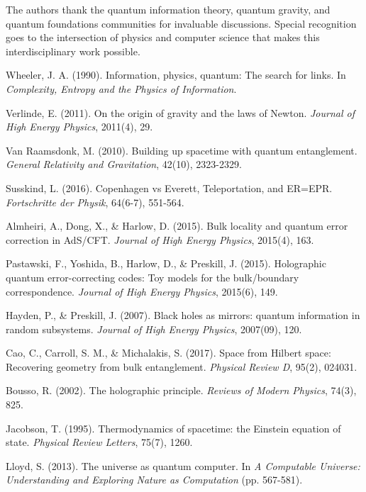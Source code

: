 \documentclass[12pt,a4paper]{article}
\begin{document}
The authors thank the quantum information theory, quantum gravity, and quantum foundations communities for invaluable discussions. Special recognition goes to the intersection of physics and computer science that makes this interdisciplinary work possible.

\begin{thebibliography}{99}

 Wheeler, J. A. (1990). Information, physics, quantum: The search for links. In \textit{Complexity, Entropy and the Physics of Information}.

 Verlinde, E. (2011). On the origin of gravity and the laws of Newton. \textit{Journal of High Energy Physics}, 2011(4), 29.

 Van Raamsdonk, M. (2010). Building up spacetime with quantum entanglement. \textit{General Relativity and Gravitation}, 42(10), 2323-2329.

 Susskind, L. (2016). Copenhagen vs Everett, Teleportation, and ER=EPR. \textit{Fortschritte der Physik}, 64(6-7), 551-564.

 Almheiri, A., Dong, X., \& Harlow, D. (2015). Bulk locality and quantum error correction in AdS/CFT. \textit{Journal of High Energy Physics}, 2015(4), 163.

 Pastawski, F., Yoshida, B., Harlow, D., \& Preskill, J. (2015). Holographic quantum error-correcting codes: Toy models for the bulk/boundary correspondence. \textit{Journal of High Energy Physics}, 2015(6), 149.

 Hayden, P., \& Preskill, J. (2007). Black holes as mirrors: quantum information in random subsystems. \textit{Journal of High Energy Physics}, 2007(09), 120.

 Cao, C., Carroll, S. M., \& Michalakis, S. (2017). Space from Hilbert space: Recovering geometry from bulk entanglement. \textit{Physical Review D}, 95(2), 024031.

 Bousso, R. (2002). The holographic principle. \textit{Reviews of Modern Physics}, 74(3), 825.

 Jacobson, T. (1995). Thermodynamics of spacetime: the Einstein equation of state. \textit{Physical Review Letters}, 75(7), 1260.

 Lloyd, S. (2013). The universe as quantum computer. In \textit{A Computable Universe: Understanding and Exploring Nature as Computation} (pp. 567-581).


\end{thebibliography}
\end{document}
